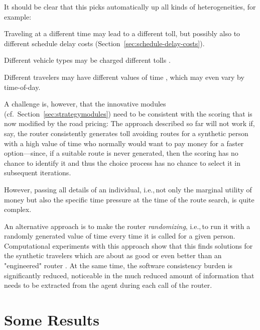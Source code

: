 It should be clear that this picks automatically up all kinds of heterogeneities, for example:
\begin{compactitem}
\item Traveling at a different time may lead to a different toll, but possibly also to different schedule delay costs (Section~\ref{sec:schedule-delay-costs}). 
\item Different vehicle types may be charged different tolls \citep{KickhoeferNagel2012EmissionInternalization}.
\item Different travelers may have different values of time \citep{NagelKickhoeferJoubertHeterogeneousVoTs}, which may even vary by time-of-day.
\end{compactitem}

A challenge is, however, that the innovative modules (cf.~Section~\ref{sec:strategymodules}) need to be consistent with the scoring that is now modified by the road pricing: The approach described so far will not work if, say, the router consistently generates toll avoiding routes for a synthetic person with a high value of time who normally would want to pay money for a faster option---since, if a suitable route is never generated, then the scoring has no chance to identify it and thus the choice process has no chance to select it in subsequent iterations.

However, passing all details of an individual, i.e.,\,not only the marginal utility of money but also the specific time pressure at the time of the route search, is quite complex.

An alternative approach is to make the router \emph{randomizing}, i.e.,\,to run it with a randomly generated value of time every time it is called for a given person. Computational experiments with this approach show that this finds solutions for the synthetic travelers which are about as good or even better than an "engineered" router \citep{NagelKickhoeferJoubertHeterogeneousVoTs}. At the same time, the software consistency burden is significantly reduced, noticeable in the much reduced amount of information that needs to be extracted from the agent during each call of the router.

\section{Some Results}
